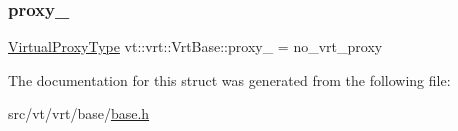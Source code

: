 \subsubsection{\texorpdfstring{proxy\+\_\+}{proxy\_}}
{\footnotesize\ttfamily \hyperlink{namespacevt_a1b417dd5d684f045bb58a0ede70045ac}{Virtual\+Proxy\+Type} vt\+::vrt\+::\+Vrt\+Base\+::proxy\+\_\+ = no\+\_\+vrt\+\_\+proxy\hspace{0.3cm}{\ttfamily [private]}}



The documentation for this struct was generated from the following file\+:\begin{DoxyCompactItemize}
\item 
src/vt/vrt/base/\hyperlink{src_2vt_2vrt_2base_2base_8h}{base.\+h}\end{DoxyCompactItemize}
